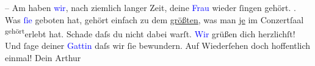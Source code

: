                – \pend
           \pstart
           Am \label{K_L02169_1v}\label{K_L02169_1h} haben \textcolor{blue}{wir}{}, nach ziemlich
               langer Zeit, deine \textcolor{blue}{Frau}{} wieder
               ſingen gehört. \label{K_L02169_2v}\label{K_L02169_2h}. Was \textcolor{blue}{ſie}{} geboten hat, gehört einfach zu dem \uline{größten}, was man \uline{je} im
               Conzertſaal \substVorne{}\textsuperscript{gehört}{\allowbreak}\substDazwischen{}erlebt\substHinten{} hat. Schade daſs du nicht dabei warſt.\pend
           \pstart \textcolor{blue}{Wir}{} grüßen dich herzlichſt! Und
               ſage deiner \textcolor{blue}{Gattin}{} daſs wir ſie
               bewundern. Auf Wiederſehen doch hoffentlich einmal! Dein \spacefill\mbox{Arthur}\pend{}\endnumbering{}  
      
